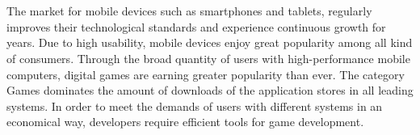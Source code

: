 



\usepackage[utf8]{inputenc} %






\newcommand{\vorname}{Sebastian}
\newcommand{\nachname}{Bohn}
\newcommand{\matrikelnummer}{2036605}

\newcommand{\titel}{Analyse und Evaluierung von plattformübergreifenden Spiel-Engines und Frameworks, anhand der Implementierung einer mobilen Beispielapplikation}

\newcommand{\erstpruef}{Prof. Dr. Edmund Weitz}
\newcommand{\zweitpruef}{Prof. Dr. Andreas Plaß}

\date{vorläufige Fassung vom \today}   %



\setlength{\parindent}{0em}
\maketitle
\tableofcontents
\clearpage


\onehalfspacing
\thispagestyle{empty}
\section*{\centering\abstractname}
The market for mobile devices such as smartphones and tablets, regularly improves their technological standards and experience continuous growth for years. 
Due to high usability, mobile devices enjoy great popularity among all kind of consumers. Through the broad quantity of users with high-performance mobile computers, digital games are earning greater popularity than ever. The category Games dominates the amount of downloads of the application stores in all leading systems. In order to meet the demands of users with different systems in an economical way, developers require efficient tools for game development.

